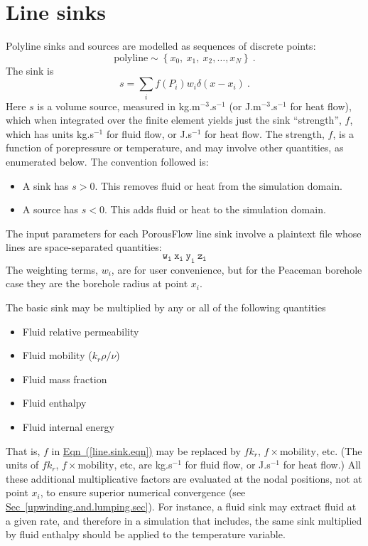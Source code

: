 \documentclass[12pt]{report}
\begin{document}
\section{Line sinks}

Polyline sinks and sources are modelled as sequences of discrete points:
\begin{equation}
\mbox{polyline}\sim \left\{x_{0},\ x_{1},\ x_{2},\ldots,x_{N}\right\} \ .
\end{equation}
The sink is
\begin{equation}
s = \sum_{i}f(P_{i})w_{i}\delta(x - x_{i}) \ .
\label{line.sink.eqn}
\end{equation}
Here $s$ is a volume source, measured in kg.m$^{-3}$.s$^{-1}$ (or
J.m$^{-3}$.s$^{-1}$ for heat flow), which when integrated over the
finite element yields just the sink ``strength'', $f$, which has units
kg.s$^{-1}$ for fluid flow, or J.s$^{-1}$ for heat flow.  
The strength, $f$, is a function of porepressure or temperature, and
may involve other quantities, as enumerated below.  The convention
followed is:
\begin{itemize}
\item A sink has $s>0$.  This removes fluid or heat from the
  simulation domain.
\item A source has $s<0$.  This adds fluid or heat to the simulation
  domain.
\end{itemize}
The input parameters for each PorousFlow line sink involve a plaintext
file whose lines are space-separated quantities:
\begin{equation}
{\mathtt{w_{i}\ x_{i}\ y_{i}\ z_{i}}}
\label{bh.plaintext.format}
\end{equation}
The weighting terms, $w_{i}$, are for user convenience, but for the
Peaceman borehole case they are the borehole radius at point $x_{i}$.

The basic sink may be multiplied by any or all of the following
quantities
\begin{itemize}
\item Fluid relative permeability
\item Fluid mobility ($k_{r} \rho / \nu$)
\item Fluid mass fraction
\item Fluid enthalpy
\item Fluid internal energy
\end{itemize}
That is, $f$ in \hyperref[line.sink.eqn]{Eqn~(\ref*{line.sink.eqn})}
may be replaced by $fk_{r}$, $f\times\mbox{mobility}$, etc.  (The
units of $fk_{r}$, $f\times\mbox{mobility}$, etc, are kg.s$^{-1}$ for
fluid flow, or J.s$^{-1}$ for heat flow.)  All these additional
multiplicative factors are evaluated at the nodal positions, not at
point $x_{i}$, to ensure superior numerical convergence (see
\hyperref[upwinding.and.lumping.sec]{Sec~\ref*{upwinding.and.lumping.sec}}).
For instance, a fluid sink may extract fluid at a given rate, and
therefore in a simulation that includes, the same sink multiplied by
fluid enthalpy should be applied to the temperature variable.
\end{document}

